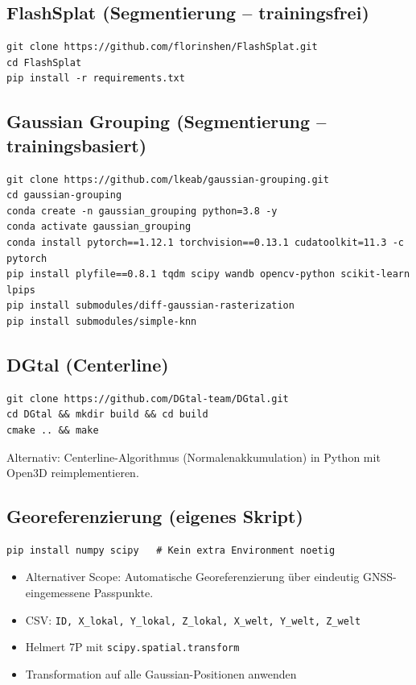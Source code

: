 \documentclass[11pt, a4paper]{article}
\begin{document}
\subsection{FlashSplat (Segmentierung -- trainingsfrei)}
\begin{lstlisting}
git clone https://github.com/florinshen/FlashSplat.git
cd FlashSplat
pip install -r requirements.txt
\end{lstlisting}

\subsection{Gaussian Grouping (Segmentierung -- trainingsbasiert)}
\begin{lstlisting}
git clone https://github.com/lkeab/gaussian-grouping.git
cd gaussian-grouping
conda create -n gaussian_grouping python=3.8 -y
conda activate gaussian_grouping
conda install pytorch==1.12.1 torchvision==0.13.1 cudatoolkit=11.3 -c pytorch
pip install plyfile==0.8.1 tqdm scipy wandb opencv-python scikit-learn lpips
pip install submodules/diff-gaussian-rasterization
pip install submodules/simple-knn
\end{lstlisting}

\subsection{DGtal (Centerline)}
\begin{lstlisting}
git clone https://github.com/DGtal-team/DGtal.git
cd DGtal && mkdir build && cd build
cmake .. && make
\end{lstlisting}
Alternativ: Centerline-Algorithmus (Normalenakkumulation) in Python mit Open3D reimplementieren.

\subsection{Georeferenzierung (eigenes Skript)}
\begin{lstlisting}
pip install numpy scipy   # Kein extra Environment noetig
\end{lstlisting}
\begin{itemize}[noitemsep]
    \item[$\square$] Alternativer Scope: Automatische Georeferenzierung \"uber eindeutig GNSS-eingemessene Passpunkte.
    \item[$\square$] CSV: \texttt{ID, X\_lokal, Y\_lokal, Z\_lokal, X\_welt, Y\_welt, Z\_welt}
    \item[$\square$] Helmert 7P mit \texttt{scipy.spatial.transform}
    \item[$\square$] Transformation auf alle Gaussian-Positionen anwenden
\end{itemize}
\end{document}

